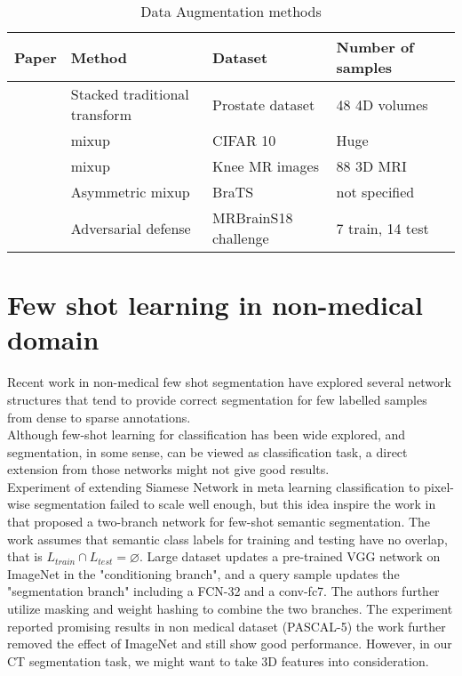 \begin{table}
\begin{tabular}{lllll}
\hline
Paper                                             & Method                        & Dataset              & Number of samples &  \\
\hline
\cite{zhang_when_2019}       & Stacked traditional transform & Prostate dataset     & 48 4D volumes     &  \\
\cite{zhang_mixup_2018}       & mixup                         & CIFAR 10             & Huge              &  \\
\cite{panfilov_improving_2019} & mixup                         & Knee MR images       & 88 3D MRI         &  \\
\cite{li_overfitting_2019}   & Asymmetric mixup              & BraTS               &  not specified             &  \\
\cite{suk_brain_2019}                    & Adversarial defense           & MRBrainS18 challenge & 7 train, 14 test  &  \\
\hline
\end{tabular}
\caption{Data Augmentation methods}
\label{tab:Augtable}
\end{table}





%
\section{Few shot learning in non-medical domain}
Recent work in non-medical few shot segmentation have explored several network structures that tend to provide correct segmentation for few labelled samples from dense to sparse annotations.\\

 Although few-shot learning for classification has been wide explored, and segmentation, in some sense, can be viewed as classification task,
 a direct extension from those networks might not give good results.\\
 
  Experiment of extending Siamese Network in meta learning classification to pixel-wise segmentation failed to scale well enough, but this idea inspire the work in \cite{shaban_one-shot_2017} that proposed a two-branch network for few-shot semantic segmentation. The work assumes that semantic class labels for training and testing have no overlap, that is $L_{train} \cap L_{test}= \varnothing$. Large dataset updates a pre-trained VGG network on ImageNet in the "conditioning branch", and a query sample updates the "segmentation branch" including a FCN-32 and a conv-fc7. The authors further utilize masking and weight hashing to combine the two branches. The experiment reported promising results in non medical dataset (PASCAL-5) the work further removed the effect of ImageNet and still show good performance. However, in our CT segmentation task, we might want to take 3D features into consideration.\\

